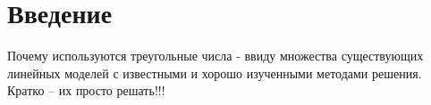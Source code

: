 \chapter*{Введение}


Почему используются треугольные числа - ввиду множества существующих линейных моделей с известными и хорошо изученными методами решения. Кратко – их просто решать!!!

